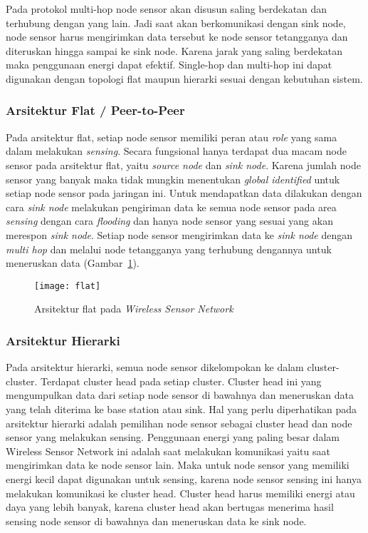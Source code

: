 Pada protokol multi-hop node sensor akan disusun saling berdekatan dan terhubung dengan yang lain. Jadi saat akan berkomunikasi dengan sink node, node sensor harus mengirimkan data tersebut ke node sensor tetangganya dan diteruskan hingga sampai ke sink node. Karena jarak yang saling berdekatan maka penggunaan energi dapat efektif. Single-hop dan multi-hop ini dapat digunakan dengan topologi flat maupun hierarki sesuai dengan kebutuhan sistem.

\subsubsection{Arsitektur Flat / Peer-to-Peer}
Pada arsitektur flat, setiap node sensor memiliki peran atau \textit{role} yang sama dalam melakukan \textit{sensing}. Secara fungsional hanya terdapat dua macam node sensor pada arsitektur flat, yaitu \textit{source node} dan \textit{sink node}. Karena jumlah node sensor yang banyak maka tidak mungkin menentukan \textit{global identified} untuk setiap node sensor pada jaringan ini. Untuk mendapatkan data dilakukan dengan cara \textit{sink node} melakukan pengiriman data ke semua node sensor pada area \textit{sensing} dengan cara \textit{flooding} dan hanya node sensor yang sesuai yang akan merespon \textit{sink node}. Setiap node sensor mengirimkan data ke \textit{sink node} dengan \textit{multi hop} dan melalui node tetangganya yang terhubung dengannya untuk meneruskan data (Gambar~\ref{fig:flat}).
\begin{figure} [H]
	\centering  
	\texttt{[image: flat]}  
	\caption[Arsitektur flat pada \textit{Wireless Sensor Network}]{Arsitektur flat pada \textit{Wireless Sensor Network}} 
	\label{fig:flat} 
\end{figure} 

\subsubsection{Arsitektur Hierarki}
Pada arsitektur hierarki, semua node sensor dikelompokan ke dalam cluster-cluster. Terdapat cluster head pada setiap cluster. Cluster head ini yang mengumpulkan data dari setiap node sensor di bawahnya dan meneruskan data yang telah diterima ke base station atau sink. Hal yang perlu diperhatikan pada arsitektur hierarki adalah pemilihan node sensor sebagai cluster head dan node sensor yang melakukan sensing. Penggunaan energi yang paling besar dalam Wireless Sensor Network ini adalah saat melakukan komunikasi yaitu saat mengirimkan data ke node sensor lain. Maka untuk node sensor yang memiliki energi kecil dapat digunakan untuk sensing, karena node sensor sensing ini hanya melakukan komunikasi ke cluster head. Cluster head harus memiliki energi atau daya yang lebih banyak, karena cluster head akan bertugas menerima hasil sensing node sensor di bawahnya dan meneruskan data ke sink node. 

